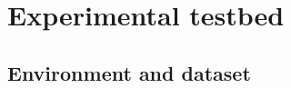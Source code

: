 \documentclass[aps,floatfix,superscriptaddress,twocolumn,tightenlines,amsmath,amssymb,nofootinbib,10pt,longbibliography,prl]{revtex4-2}
\begin{document}




\section{Experimental testbed}
\label{sec:testbed}

\subsection{Environment and dataset}
\label{subsec:dataset}
\end{document}
